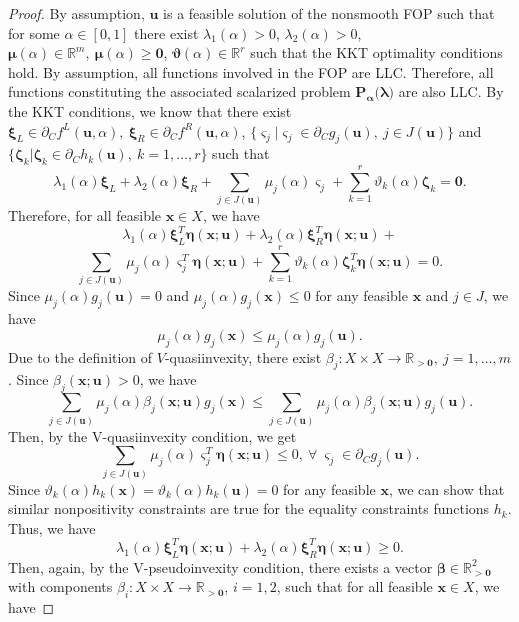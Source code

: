 \documentclass{article}
\theoremstyle{definition}
\begin{document}
\begin{proof} By assumption, $\boldsymbol u$ is a feasible solution of the nonsmooth FOP such that for some $ \alpha \in [0,1]$ there exist $\lambda_1( \alpha) > 0$, $\lambda_2( \alpha) > 0$, $\boldsymbol { \mu}( \alpha) \in \mathbb R^{m},\ \boldsymbol{ \mu}( \alpha) \geq \boldsymbol 0$, $\boldsymbol { \vartheta}( \alpha) \in \mathbb R^r$ such that the KKT optimality conditions hold. By assumption, all functions involved in the FOP are LLC. Therefore, all functions constituting the associated scalarized problem $\boldsymbol {P_{\alpha}({\boldsymbol \lambda)}}$ are also LLC. By the KKT conditions, we know that there exist $\boldsymbol \xi_L \in \partial_C f^L(\boldsymbol u,  \alpha),\ \boldsymbol \xi_R \in \partial_C f^R(\boldsymbol u,  \alpha)$, $\{\boldsymbol \varsigma_j | \boldsymbol \varsigma_j \in \partial_C g_j(\boldsymbol u),\ j \in J(\boldsymbol{u})\}$ and $\{\boldsymbol \zeta_k | \boldsymbol \zeta_k \in \partial_C h_k(\boldsymbol u),\ k=1,\dots,r\}$ such that
$$ \lambda_1( \alpha) \boldsymbol \xi_L +  \lambda_2( \alpha) \boldsymbol \xi_R + \sum_{j \in J(\boldsymbol{u})} \mu_j( \alpha) \boldsymbol \varsigma_j + \sum_{k=1}^r \vartheta_k( \alpha) \boldsymbol \zeta_k = \boldsymbol 0.$$
Therefore, for all feasible $\boldsymbol x\in X$, we have 
$$ \lambda_1( \alpha) \boldsymbol \xi_{L}^T \boldsymbol \eta(\boldsymbol x; \boldsymbol u) +  \lambda_2( \alpha) \boldsymbol \xi_{R}^T \boldsymbol \eta(\boldsymbol x; \boldsymbol u) +$$ $$\sum_{j \in J(\boldsymbol{u})} \mu_j( \alpha) \boldsymbol \varsigma_j^T \boldsymbol \eta(\boldsymbol x; \boldsymbol u)+\sum_{k=1}^r \vartheta_k( \alpha) \boldsymbol \zeta^T_k \boldsymbol \eta(\boldsymbol x; \boldsymbol u) = 0.$$
Since $ \mu_j( \alpha) g_j(\boldsymbol u) = 0$ and $ \mu_j( \alpha) g_j(\boldsymbol x) \leq 0$ for any feasible $\boldsymbol x$ and $j\in J$, we have $$ \mu_j( \alpha) g_j(\boldsymbol x) \leq  \mu_j( \alpha) g_j(\boldsymbol u).$$
Due to the definition of $V$-quasiinvexity, there exist $\beta_j : X \times X \rightarrow \mathbb R_{> \boldsymbol 0},\ j=1,\dots,m$. Since $\beta_j(\boldsymbol x; \boldsymbol u) > 0$, we have 
$$\sum_{j \in J(\boldsymbol{u})}  \mu_j( \alpha) \beta_j(\boldsymbol x; \boldsymbol u) g_j(\boldsymbol x) \leq \sum_{j \in J(\boldsymbol{u})}  \mu_j( \alpha) \beta_j(\boldsymbol x; \boldsymbol u) g_j(\boldsymbol u).$$
Then, by the V-quasiinvexity condition, we get
$$\sum_{j \in J(\boldsymbol{u})}  \mu_j( \alpha) \boldsymbol \varsigma_j^T \boldsymbol \eta(\boldsymbol x; \boldsymbol u) \leq 0,\ \forall\ \boldsymbol \varsigma_j \in \partial_C g_j(\boldsymbol u).$$
Since $ \vartheta_k( \alpha) h_k(\boldsymbol x) =  \vartheta_k( \alpha) h_k(\boldsymbol u) = 0$ for any feasible $\boldsymbol x$, we can show that similar nonpositivity constraints are true for the equality constraints functions $h_k$. Thus, we have
$$ \lambda_1( \alpha) \boldsymbol \xi_{L}^T \boldsymbol \eta(\boldsymbol x; \boldsymbol u) +  \lambda_2( \alpha) \boldsymbol \xi_{R}^T \boldsymbol \eta(\boldsymbol x; \boldsymbol u) \geq 0.$$
Then, again, by the V-pseudoinvexity condition, there exists a vector $\boldsymbol \beta\in \mathbb R^2_{> \boldsymbol 0}$ with components $\beta_i: X \times X \rightarrow \mathbb R_{> \boldsymbol 0}$, $i=1,2$, such that for all feasible $\boldsymbol x\in X$,  we have


\end{proof}
\end{document}
